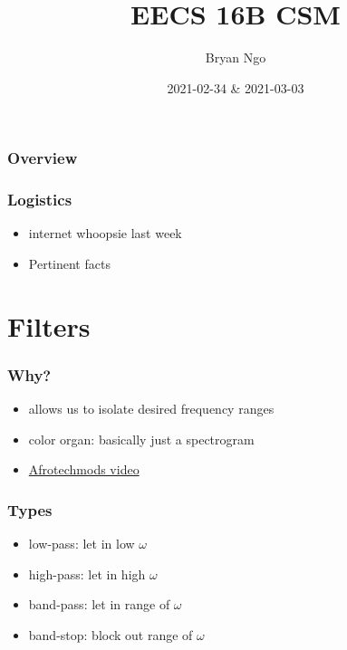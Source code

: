 \documentclass[aspectratio=169]{beamer}
\title{EECS 16B CSM}
\author{Bryan Ngo}
\date{2021-02-34 \& 2021-03-03}
\institute{Computer Science Mentors}
\begin{document}
\begin{frame}
    \maketitle
\end{frame}

\begin{frame}
    \frametitle{Overview}

    \tableofcontents
\end{frame}

\begin{frame}
    \frametitle{Logistics}

    \begin{itemize}
        \item internet whoopsie last week
        \item Pertinent facts
    \end{itemize}
\end{frame}

\section{Filters}

\begin{frame}
    \frametitle{Why?}

    \begin{itemize}
        \item allows us to isolate desired frequency ranges
        \item color organ: basically just a spectrogram
        \item \href{https://youtu.be/OBM5T5_kgdI}{Afrotechmods video}
    \end{itemize}
\end{frame}

\begin{frame}
    \frametitle{Types}

    \begin{itemize}
        \item low-pass: let in low \(\omega\)
        \item high-pass: let in high \(\omega\)
        \item band-pass: let in range of \(\omega\)
        \item band-stop: block out range of \(\omega\)
    \end{itemize}

\end{frame}
\end{document}
